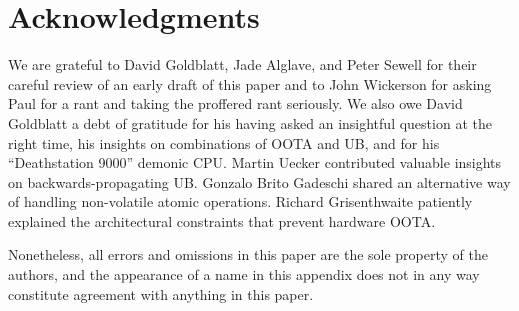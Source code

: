 \documentclass[10]{article}
\begin{document}

\clearpage

\section{Acknowledgments}
\label{sec:Acknowledgments}

We are grateful to David Goldblatt, Jade Alglave, and Peter
Sewell for their careful review of an early draft of this paper and
to John Wickerson for asking Paul for a rant and taking the proffered
rant seriously.
We also owe David Goldblatt a debt of gratitude for his having asked an
insightful question at the right time, his insights on combinations of
OOTA and UB, and for his ``Deathstation 9000'' demonic CPU.
Martin Uecker contributed valuable insights on backwards-propagating UB.
Gonzalo Brito Gadeschi shared an alternative way of handling non-volatile
atomic operations.
Richard Grisenthwaite patiently explained the architectural constraints
that prevent hardware OOTA.

Nonetheless, all errors and omissions in this paper are the sole property
of the authors, and the appearance of a name in this appendix does
not in any way constitute agreement with anything in this paper.

\end{document}
